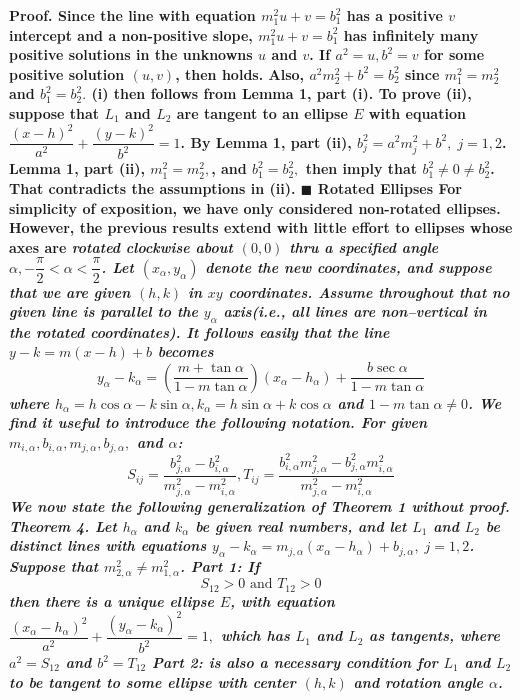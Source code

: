 \nl \bf Proof. \rm Since the line with equation $m_{1}^{2}u+v=b_{1}^{2}$ has a positive $v$ intercept and a non-positive slope, $m_{1}^{2}u+v=b_{1}^{2}$ has infinitely many positive solutions in the unknowns $u$ and $v$. If $a^{2}=u,b^{2}=v$ for some positive solution $(u,v)$, then   holds. Also, $a^{2}m_{2}^{2}+b^{2}=b_{2}^{2}$ since $m_{1}^{2}=m_{2}^{2}$ and $b_{1}^{2}=b_{2}^{2}.$ (i) then follows from Lemma 1, part (i). To prove (ii), suppose that $L_{1}$ and $L_{2}$ are tangent to an ellipse $E$ with equation $\dfrac{(x-h)^{2}}{a^{2}}+\dfrac{(y-k)^{2}}{b^{2}}=1$. By Lemma 1, part (ii), $b_{j}^{2}=a^{2}m_{j}^{2}+b^{2},\;j=1,2$. Lemma 1, part (ii), $m_{1}^{2}=m_{2}^{2},$, and $b_{1}^{2}=b_{2}^{2},$ then imply that $b_{1}^{2}\neq 0\neq b_{2}^{2}$. That contradicts the assumptions in (ii). $\blacksquare$ \newline 
\nl \bf Rotated Ellipses \rm \nl
	For simplicity of exposition, we have only considered non-rotated ellipses. However, the previous results extend with little effort to ellipses whose axes are \it rotated \rm clockwise about $(0,0)$ thru a specified angle $\alpha ,-\dfrac{\pi }{2}<\alpha <\dfrac{\pi }{2}$. Let $(x_{\alpha },y_{\alpha })$ denote the new coordinates, and suppose that we are given $(h,k)$ in $xy$ coordinates. Assume throughout that no given line is parallel to the $y_\alpha$ axis(i.e., all lines are non--vertical in the rotated coordinates). It follows easily that the line $y-k=m(x-h)+b$ becomes $$y_{\alpha }-k_{\alpha }=\left( \frac{m+\tan \alpha }{1-m\tan \alpha }\right) (x_{\alpha }-h_{\alpha })+\frac{b\sec \alpha }{1-m\tan \alpha }\tag{15}$$ where $h_{\alpha }=h\cos \alpha -k\sin \alpha ,k_{\alpha }=h\sin \alpha +k\cos \alpha $ and $1-m\tan \alpha \neq 0$. We find it useful to introduce the following notation. For given $m_{i,\alpha },b_{i,\alpha }, 
m_{j,\alpha },b_{j,\alpha },$ and $\alpha $: $$S_{ij}=\dfrac{b_{j,\alpha }^{2}-b_{i,\alpha }^{2}}{m_{j,\alpha }^{2}-m_{i,\alpha }^{2}},T_{ij}=\dfrac{b_{i,\alpha }^{2}m_{j,\alpha }^{2}-b_{j,\alpha }^{2}m_{i,\alpha }^{2}}{m_{j,\alpha }^{2}-m_{i,\alpha }^{2}}\tag{16}$$ We now state the following generalization of Theorem 1 without proof.
\nl \nl \bf Theorem 4. \rm  Let $h_\alpha$ and $k_\alpha$ be given real numbers, and let $L_{1}$ and $L_{2}$ be distinct lines with equations $y_{\alpha }-k_{\alpha }=m_{j,\alpha }(x_{\alpha }-h_{\alpha })+b_{j,\alpha },\;j=1,2$.  Suppose that $m_{2,\alpha }^{2}\neq m_{1,\alpha }^{2}$. \newline Part 1: If $$S_{12}>0\text{ and }T_{12}>0\tag{17}$$ then there is a unique ellipse $E$, with equation $\dfrac{(x_{\alpha }-h_{\alpha })^{2}}{a^{2}}+\dfrac{(y_{\alpha }-k_{\alpha })^{2}}{b^{2}}=1,$ which has $L_{1}$ and $L_{2}$ as tangents, where $a^{2}=S_{12}$ and $b^{2}=T_{12}$ \newline Part 2:  is also a \it necessary \rm condition for $L_{1}$ and $L_{2}$ to be tangent to some ellipse with center $(h,k)$ and rotation angle $\alpha $. \nl 
